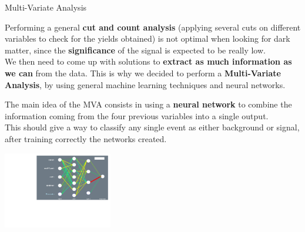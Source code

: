 \documentclass[8 pt]{beamer}
\begin{document}
\begin{frame}{Multi-Variate Analysis}

	\justifying 
	Performing a general \textbf{cut and count analysis} (applying several cuts on different variables to check for the yields obtained) is not optimal when looking for dark matter, since the \textbf{significance} of the signal is expected to be really low. \\ \vspace{10pt}
	 We then need to come up with solutions to \textbf{extract as much information as we can} from the data. This is why we decided to perform a \textbf{Multi-Variate Analysis}, by using general machine learning techniques and neural networks. \vfill

	\hspace{10pt}
	\begin{minipage}[c]{.45\linewidth}
	
   	\begin{block}{}
	\justifying
	\vspace{5pt}
	The main idea of the MVA consists in using a \textbf{neural network} to combine the information coming from the four previous variables into a single output. \\ \vspace{8pt}
	This should give a way to classify any single event as either background or signal, after training correctly the networks created. \vspace{5pt}
	\end{block}
		
	\end{minipage}
	\hspace{5pt}
	 \begin{minipage}[c]{.48\linewidth}
   	
	\begin{center}
	\vspace{8pt}
	\includegraphics[width=135pt, height=95pt]{figs/newMVA/sigmoid_architecture.pdf}
	\end{center}
	
	\end{minipage} \vfill

\end{frame}
\end{document}
